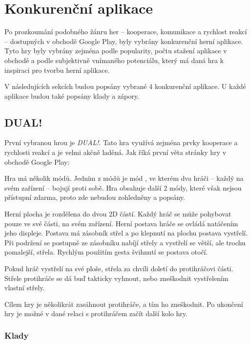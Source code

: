 \chapter{Konkurenční aplikace}

Po prozkoumání podobného žánru her
– kooperace, komunikace a rychlost reakcí –
dostupných v obchodě Google Play,
byly vybrány konkurenční herní aplikace.
Tyto hry byly vybrány zejména podle popularity,
počtu stažení aplikace v obchodě
a podle subjektivně vnímaného potenciálu,
který má daná hra k inspiraci pro tvorbu herní aplikace.

V následujících sekcích budou popsány vybrané 4 konkurenční aplikace.
U každé aplikace budou také popsány klady a zápory.

\section{DUAL!}

První vybranou hrou je \emph{DUAL!}.
Tato hra využívá zejména prvky kooperace a rychlosti reakcí
a je velmi akčně laděná.
Jak říká první věta stránky hry \cite{seabaa_dual} v obchodě Google Play:

Hra má několik módů.
Jedním z módů je mód , ve kterém dva hráči
– každý na svém zařízení –
bojují proti sobě.
Hra obsahuje další 2 módy, které však nejsou přístupní zdarma,
proto zde nebudou zohledněny a popsány.

Herní plocha je rozdělena do dvou 2D částí.
Každý hráč se může pohybovat pouze ve své části, na svém zařízení.
Herní postava hráče se ovládá natáčením jeho displeje.
Postava má zásobník střel a po klepnutí na plochu postava vystřelí.
Při podržení se postupně ze zásobníku nabíjí střely
a vystřelí se větší, ale trochu pomalejší, střela.
Rychlým použitím gesta švihnutí se postava otočí.

Pokud hráč vystřelí na své ploše,
střela za chvíli doletí do protihráčovi části.
Střele protihráče se dá buď takticky vyhnout,
nebo zneškodnit vystřelením vlastní střely.

Cílem hry je několikrát zasáhnout protihráče, a tím ho zneškodnit.
Po ukončení hry je možné v dané relaci s protihráčem začít další kolo hry.

\FloatBarrier

\subsection*{Klady}

